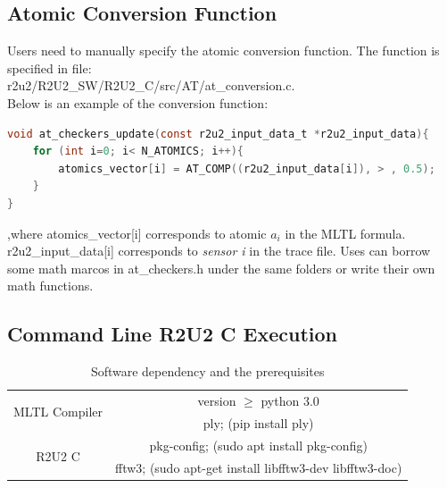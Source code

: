 \subsection{Atomic Conversion Function}
Users need to manually specify the atomic conversion function. The function is specified in file: \\
\colorbox{gray!30}{r2u2/R2U2\_SW/R2U2\_C/src/AT/at\_conversion.c}. \\
Below is an example of the conversion function:
\begin{lstlisting}[language=C]
void at_checkers_update(const r2u2_input_data_t *r2u2_input_data){
	for (int i=0; i< N_ATOMICS; i++){
		atomics_vector[i] = AT_COMP((r2u2_input_data[i]), > , 0.5);
	}
}
\end{lstlisting}
,where \colorbox{blue!30}{atomics\_vector[i]} corresponds to atomic $a_i$ in the MLTL formula. \colorbox{blue!30}{r2u2\_input\_data[i]} corresponds to \textit{sensor i} in the trace file.
Uses can borrow some math marcos in \colorbox{gray!30}{at\_checkers.h} under the same folders or write their own math functions. 



\subsection{Command Line R2U2 C Execution}

\begin{table}[ht]
  \caption{Software dependency and the prerequisites}
  \label{tab:c_trace}
  \begin{center}
  \begin{tabular}{c|c}
      \hline
      \multirow{2}{*}{MLTL Compiler}& version $\geq$ python 3.0\\
      \cline{2-2}
      & ply; (pip install ply)\\
      \hline
      \multirow{2}{*}{R2U2 C}& pkg-config; (sudo apt install pkg-config)\\
      \cline{2-2}
      &  fftw3; (sudo apt-get install libfftw3-dev libfftw3-doc)\\
      \hline
  \end{tabular}
  \end{center}
  \label{tab:multicol}
  \end{table}

